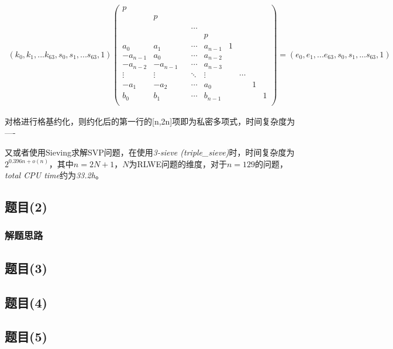 \documentclass[12pt,a4paper]{article}
\numberwithin{equation}{section}
\begin{document}
\begin{align}
	(k_0,k_1,...k_{63},s_0,s_1,...s_{63},1)
	\left(
	\begin{smallmatrix}
			p\\
			&p\\
			&&\\
			&&&\cdots\\
			&&&&p\\
			a_0    &a_1    &   &\cdots &a_{n-1}            &1\\
			-a_{n-1}&a_0    &   &\cdots &a_{n-2}       &&\\
			-a_{n-2}&-a_{n-1}&   &\cdots &a_{n-3}  &&\\
			\vdots &\vdots &&\ddots &\vdots             &&\cdots\\
			-a_1    &-a_2    &   &\cdots &a_0 &&&1\\
			b_0    &b_1    &   &\cdots &b_{n-1}&&&&1\\
		\end{smallmatrix}
	\right)
	=
	(e_0,e_1,...e_{63},s_0,s_1,...s_{63},1)
\end{align}

对格进行格基约化，则约化后的第一行的[n,2n]项即为私密多项式，时间复杂度为----

又或者使用Sieving求解SVP问题，在使用\textit{3-sieve (triple\_sieve)}时，时间复杂度为$2^{0.396n+o(n)}$，其中$n=2N+1$，$N$为RLWE问题的维度，对于$n=129$的问题，\textit{total CPU time}约为\textit{33.2h}。

\subsection{题目(2)}

\subsubsection{解题思路}

\subsection{题目(3)}

\subsection{题目(4)}

\subsection{题目(5)}
\end{document}
